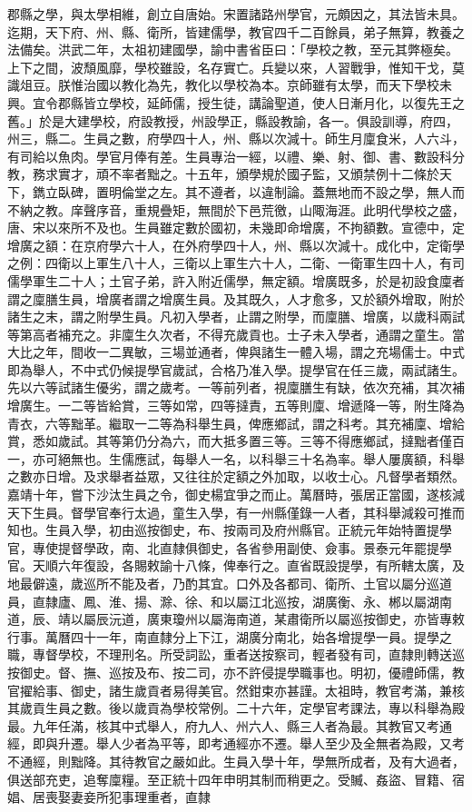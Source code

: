 郡縣之學，與太學相維，創立自唐始。宋置諸路州學官，元頗因之，其法皆未具。迄期，天下府、州、縣、衛所，皆建儒學，教官四千二百餘員，弟子無算，教養之法備矣。洪武二年，太祖初建國學，諭中書省臣曰：「學校之教，至元其弊極矣。上下之間，波頹風靡，學校雖設，名存實亡。兵變以來，人習戰爭，惟知干戈，莫識俎豆。朕惟治國以教化為先，教化以學校為本。京師雖有太學，而天下學校未興。宜令郡縣皆立學校，延師儒，授生徒，講論聖道，使人日漸月化，以復先王之舊。」於是大建學校，府設教授，州設學正，縣設教諭，各一。俱設訓導，府四，州三，縣二。生員之數，府學四十人，州、縣以次減十。師生月廩食米，人六斗，有司給以魚肉。學官月俸有差。生員專治一經，以禮、樂、射、御、書、數設科分教，務求實才，頑不率者黜之。十五年，頒學規於國子監，又頒禁例十二條於天下，鐫立臥碑，置明倫堂之左。其不遵者，以違制論。蓋無地而不設之學，無人而不納之教。庠聲序音，重規疊矩，無間於下邑荒徼，山陬海涯。此明代學校之盛，唐、宋以來所不及也。生員雖定數於國初，未幾即命增廣，不拘額數。宣德中，定增廣之額：在京府學六十人，在外府學四十人，州、縣以次減十。成化中，定衛學之例：四衛以上軍生八十人，三衛以上軍生六十人，二衛、一衛軍生四十人，有司儒學軍生二十人；土官子弟，許入附近儒學，無定額。增廣既多，於是初設食廩者謂之廩膳生員，增廣者謂之增廣生員。及其既久，人才愈多，又於額外增取，附於諸生之末，謂之附學生員。凡初入學者，止謂之附學，而廩膳、增廣，以歲科兩試等第高者補充之。非廩生久次者，不得充歲貢也。士子未入學者，通謂之童生。當大比之年，間收一二異敏，三場並通者，俾與諸生一體入場，謂之充場儒士。中式即為舉人，不中式仍候提學官歲試，合格乃准入學。提學官在任三歲，兩試諸生。先以六等試諸生優劣，謂之歲考。一等前列者，視廩膳生有缺，依次充補，其次補增廣生。一二等皆給賞，三等如常，四等撻責，五等則廩、增遞降一等，附生降為青衣，六等黜革。繼取一二等為科舉生員，俾應鄉試，謂之科考。其充補廩、增給賞，悉如歲試。其等第仍分為六，而大抵多置三等。三等不得應鄉試，撻黜者僅百一，亦可絕無也。生儒應試，每舉人一名，以科舉三十名為率。舉人屢廣額，科舉之數亦日增。及求舉者益眾，又往往於定額之外加取，以收士心。凡督學者類然。嘉靖十年，嘗下沙汰生員之令，御史楊宜爭之而止。萬曆時，張居正當國，遂核減天下生員。督學官奉行太過，童生入學，有一州縣僅錄一人者，其科舉減殺可推而知也。生員入學，初由巡按御史，布、按兩司及府州縣官。正統元年始特置提學官，專使提督學政，南、北直隸俱御史，各省參用副使、僉事。景泰元年罷提學官。天順六年復設，各賜敕諭十八條，俾奉行之。直省既設提學，有所轄太廣，及地最僻遠，歲巡所不能及者，乃酌其宜。口外及各都司、衛所、土官以屬分巡道員，直隸廬、鳳、淮、揚、滁、徐、和以屬江北巡按，湖廣衡、永、郴以屬湖南道，辰、靖以屬辰沅道，廣東瓊州以屬海南道，某肅衛所以屬巡按御史，亦皆專敕行事。萬曆四十一年，南直隸分上下江，湖廣分南北，始各增提學一員。提學之職，專督學校，不理刑名。所受詞訟，重者送按察司，輕者發有司，直隸則轉送巡按御史。督、撫、巡按及布、按二司，亦不許侵提學職事也。明初，優禮師儒，教官擢給事、御史，諸生歲貢者易得美官。然鉗束亦甚謹。太祖時，教官考滿，兼核其歲貢生員之數。後以歲貢為學校常例。二十六年，定學官考課法，專以科舉為殿最。九年任滿，核其中式舉人，府九人、州六人、縣三人者為最。其教官又考通經，即與升遷。舉人少者為平等，即考通經亦不遷。舉人至少及全無者為殿，又考不通經，則黜降。其待教官之嚴如此。生員入學十年，學無所成者，及有大過者，俱送部充吏，追奪廩糧。至正統十四年申明其制而稍更之。受贓、姦盜、冒籍、宿娼、居喪娶妻妾所犯事理重者，直隸